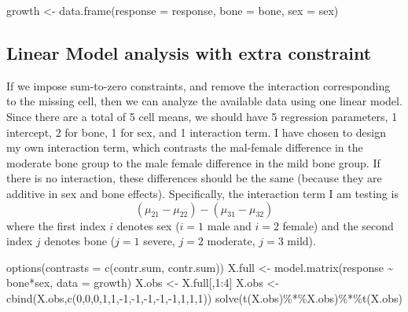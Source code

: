 \documentclass[
]{book}
\newenvironment{Shaded}{\begin{snugshade}}{\end{snugshade}}
\newcommand{\AttributeTok}[1]{\textcolor[rgb]{0.77,0.63,0.00}{#1}}
\newcommand{\DecValTok}[1]{\textcolor[rgb]{0.00,0.00,0.81}{#1}}
\newcommand{\FunctionTok}[1]{\textcolor[rgb]{0.00,0.00,0.00}{#1}}
\newcommand{\NormalTok}[1]{#1}
\newcommand{\OtherTok}[1]{\textcolor[rgb]{0.56,0.35,0.01}{#1}}
\newcommand{\SpecialCharTok}[1]{\textcolor[rgb]{0.00,0.00,0.00}{#1}}
\newcommand{\StringTok}[1]{\textcolor[rgb]{0.31,0.60,0.02}{#1}}
\begin{document}
\begin{Shaded}
\begin{Highlighting}[]
\NormalTok{growth }\OtherTok{\textless{}{-}} \FunctionTok{data.frame}\NormalTok{(}\AttributeTok{response =}\NormalTok{ response, }\AttributeTok{bone =}\NormalTok{ bone, }\AttributeTok{sex =}\NormalTok{ sex)}
\end{Highlighting}
\end{Shaded}

\hypertarget{linear-model-analysis-with-extra-constraint}{%
\subsection{Linear Model analysis with extra constraint}\label{linear-model-analysis-with-extra-constraint}}

If we impose sum-to-zero constraints, and remove the interaction corresponding to the missing cell, then we can analyze the available data using one linear model.
Since there are a total of 5 cell means, we should have 5 regression parameters, 1 intercept, 2 for bone, 1 for sex, and 1 interaction term. I have chosen to design my own interaction term, which contrasts the mal-female difference in the moderate bone group to the male female difference in the mild bone group. If there is no interaction, these differences should be the same (because they are additive in sex and bone effects). Specifically, the interaction term I am testing is
\[(\mu_{21}-\mu_{22}) - (\mu_{31} - \mu_{32})\]
where the first index \(i\) denotes sex (\(i=1\) male and \(i=2\) female) and the second index \(j\) denotes bone (\(j=1\) severe, \(j=2\) moderate, \(j = 3\) mild).

\begin{Shaded}
\begin{Highlighting}[]
\FunctionTok{options}\NormalTok{(}\AttributeTok{contrasts =} \FunctionTok{c}\NormalTok{(}\StringTok{\textquotesingle{}contr.sum\textquotesingle{}}\NormalTok{, }\StringTok{\textquotesingle{}contr.sum\textquotesingle{}}\NormalTok{))}
\NormalTok{X.full }\OtherTok{\textless{}{-}} \FunctionTok{model.matrix}\NormalTok{(response }\SpecialCharTok{\textasciitilde{}}\NormalTok{ bone}\SpecialCharTok{*}\NormalTok{sex, }\AttributeTok{data =}\NormalTok{ growth)}
\NormalTok{X.obs }\OtherTok{\textless{}{-}}\NormalTok{ X.full[,}\DecValTok{1}\SpecialCharTok{:}\DecValTok{4}\NormalTok{]}
\NormalTok{X.obs }\OtherTok{\textless{}{-}} \FunctionTok{cbind}\NormalTok{(X.obs,}\FunctionTok{c}\NormalTok{(}\DecValTok{0}\NormalTok{,}\DecValTok{0}\NormalTok{,}\DecValTok{0}\NormalTok{,}\DecValTok{1}\NormalTok{,}\DecValTok{1}\NormalTok{,}\SpecialCharTok{{-}}\DecValTok{1}\NormalTok{,}\SpecialCharTok{{-}}\DecValTok{1}\NormalTok{,}\SpecialCharTok{{-}}\DecValTok{1}\NormalTok{,}\SpecialCharTok{{-}}\DecValTok{1}\NormalTok{,}\SpecialCharTok{{-}}\DecValTok{1}\NormalTok{,}\DecValTok{1}\NormalTok{,}\DecValTok{1}\NormalTok{,}\DecValTok{1}\NormalTok{))}
\FunctionTok{solve}\NormalTok{(}\FunctionTok{t}\NormalTok{(X.obs)}\SpecialCharTok{\%*\%}\NormalTok{X.obs)}\SpecialCharTok{\%*\%}\FunctionTok{t}\NormalTok{(X.obs)}
\end{Highlighting}
\end{Shaded}
\end{document}
